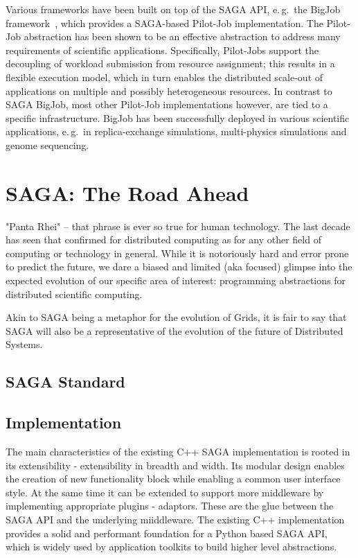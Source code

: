 \documentclass{article}
\begin{document}
Various frameworks have been built on top of the SAGA API, e.\,g.\ the BigJob
framework~\cite{saga_bigjob_condor_cloud}, which provides a SAGA-based
Pilot-Job implementation. The Pilot-Job abstraction has been shown to be an
effective abstraction to address many requirements of scientific applications.
Specifically, Pilot-Jobs support the decoupling of workload submission from
resource assignment; this results in a flexible execution model, which in turn
enables the distributed scale-out of applications on multiple and possibly
heterogeneous resources. In contrast to SAGA BigJob, most other Pilot-Job
implementations however, are tied to a specific infrastructure. BigJob has 
been successfully deployed in various scientific applications, e.\,g.\ in 
replica-exchange simulations, multi-physics simulations and genome sequencing.


\section{SAGA: The Road Ahead}
\label{sec:road}

  "Panta Rhei" -- that phrase is ever so true for human technology.
  The last decade has seen that confirmed for distributed computing as
  for any other field of computing or technology in general.  While it
  is notoriously hard and error prone to predict the future, we dare a
  biased and limited (aka focused) glimpse into the expected evolution
  of our specific area of interest: programming abstractions for
  distributed scientific computing. 

  Akin to SAGA being a metaphor for the evolution of Grids, it is fair
  to say that SAGA will also be a representative of the evolution of
  the future of Distributed Systems.

\subsection{SAGA Standard}
\subsection{Implementation}

The main characteristics of the existing C++ SAGA implementation is rooted in its
extensibility - extensibility in breadth and width. Its modular design enables the
creation of new functionality block while enabling a common user interface style.
At the same time it can be extended to support more middleware by implementing
appropriate plugins - adaptors. These are the glue between the SAGA API and 
the underlying miiddleware. The existing C++ implementation provides a solid 
and performant foundation for a Python based SAGA API, which is widely used 
by application toolkits to build higher level abstractions.
\end{document}
